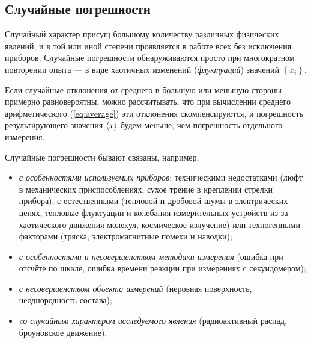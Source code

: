 
\subsection{Случайные погрешности}

Случайный характер присущ большому количеству различных физических
явлений, и в той или иной степени проявляется в работе всех без исключения
приборов. Случайные погрешности обнаруживаются просто при многократном
повторении опыта --- в виде хаотичных изменений (\emph{флуктуаций})
значений $\left\{ x_{i}\right\} $.

Если случайные отклонения от среднего в большую или меньшую стороны
примерно равновероятны, можно рассчитывать, что при вычислении среднего
арифметического (\ref{eq:average}) эти отклонения скомпенсируются,
и погрешность результирующего значения $\left<x\right>$ будем меньше,
чем погрешность отдельного измерения.

Случайные погрешности бывают связаны, например,
\begin{itemize}
    \item \emph{с особенностями используемых приборов}: техническими
недостатками
(люфт в механических приспособлениях, сухое трение в креплении стрелки
прибора), с естественными (тепловой и дробовой шумы в электрических
цепях, тепловые флуктуации и колебания измерительных устройств из-за
хаотического движения молекул, космическое излучение) или техногенными
факторами (тряска, электромагнитные помехи и наводки);

    \item \emph{с особенностями и несовершенством методики измерения} (ошибка
при отсчёте по шкале, ошибка времени реакции при измерениях с секундомером);

    \item \emph{с несовершенством объекта измерений} (неровная поверхность,
неоднородность состава);

    \item \emph{cо случайным характером исследуемого явления} (радиоактивный
распад, броуновское движение).
\end{itemize}

